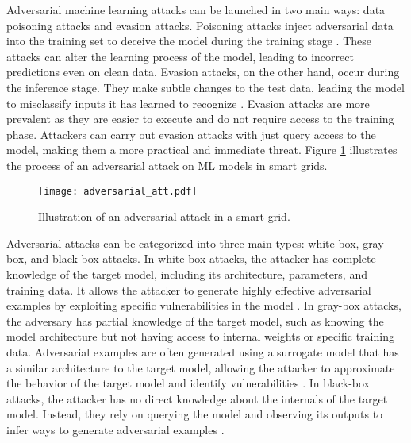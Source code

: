 \documentclass[10pt, journal]{IEEEtran}
\begin{document}
Adversarial machine learning attacks can be launched in two main ways: data poisoning attacks and evasion attacks. Poisoning attacks inject adversarial data into the training set to deceive the model during the training stage \cite{munoz2017towards, shafahi2018poison}. These attacks can alter the learning process of the model, leading to incorrect predictions even on clean data. Evasion attacks, on the other hand, occur during the inference stage. They make subtle changes to the test data, leading the model to misclassify inputs it has learned to recognize \cite{flowers2019evaluating, zhang2015adversarial, biggio2013evasion}. Evasion attacks are more prevalent as they are easier to execute and do not require access to the training phase. Attackers can carry out evasion attacks with just query access to the model, making them a more practical and immediate threat. Figure \ref{figure:adversarial} illustrates the process of an adversarial attack on ML models in smart grids.


\begin{figure}[htbp]
\centerline{\texttt{[image: adversarial\_att.pdf]}}
\caption{Illustration of an adversarial attack in a smart grid.}
\label{figure:adversarial}
\end{figure}

Adversarial attacks can be categorized into three main types: white-box, gray-box, and black-box attacks. In white-box attacks, the attacker has complete knowledge of the target model, including its architecture, parameters, and training data. It allows the attacker to generate highly effective adversarial examples by exploiting specific vulnerabilities in the model \cite{zhou2024investigating, roshan2024untargeted,mahbub2024robustness}. In gray-box attacks, the adversary has partial knowledge of the target model, such as knowing the model architecture but not having access to internal weights or specific training data. Adversarial examples are often generated using a surrogate model that has a similar architecture to the target model, allowing the attacker to approximate the behavior of the target model and identify vulnerabilities \cite{jo2024exploring, apruzzese2022mitigating, wang2022gray}. In black-box attacks, the attacker has no direct knowledge about the internals of the target model. Instead, they rely on querying the model and observing its outputs to infer ways to generate adversarial examples \cite{papernot2017practical,suya2024sok,liu2024boosting,chen2017zoo,zhou2018transferable,dong2018boosting,thomas2022dynamic,ilyas2018black}. 
\end{document}
